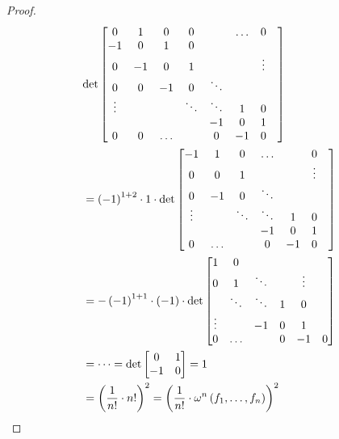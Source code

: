 \documentclass[../SymplecticSimplices.tex]{subfiles}
\begin{document}
\begin{proof}
\begin{align*}
    & \textnormal{det} \begin{bmatrix}
      0 &  1 & 0 & 0 & & \dots & 0 \\
      -1 &  0 & 1 & 0 & & &  \\
      0 & -1 & 0 & 1 & & & \vdots \\
      0 & 0 & -1 & 0 & \ddots & & & \\
      \vdots & & & \ddots & \ddots & 1 & 0 \\
      & & & & -1 & 0 & 1 \\
      0 & 0 & \dots & & 0 & -1 & 0 \\
    \end{bmatrix}
 \\ &
    = \left( -1 \right)^{1+2} \cdot 1 \cdot
    \textnormal{det} \begin{bmatrix}
      -1 & 1 & 0 & \dots & & 0 \\
      0 & 0 & 1 & & & \vdots \\
      0 & -1 & 0 & \ddots & & & \\
      \vdots & & \ddots & \ddots & 1 & 0 \\
      & & & -1 & 0 & 1 \\
      0 & \dots & & 0 & -1 & 0 \\
    \end{bmatrix}
 \\ &
    = - \left(-1\right)^{1+1} \cdot \left( -1 \right) \cdot
    \textnormal{det} \begin{bmatrix}
      1 & 0 & & &  \\
      0 & 1 & \ddots & & \vdots \\
      & \ddots & \ddots & 1 & 0 \\
      \vdots & & -1 & 0 & 1 \\
      0 & \dots & & 0 & -1 & 0 \\
    \end{bmatrix}
 \\ &
    = \dots =
    \textnormal{det} \begin{bmatrix}
      0 & 1\\
      -1 & 0
    \end{bmatrix} = 1
 \\ &
    = \left( \frac{1}{n!} \cdot n!\right)^2 = \left( \frac{1}{n!} \cdot \omega^n \left( f_1, \dots, f_n \right) \right)^2
  \end{align*}
\end{proof}
\end{document}
